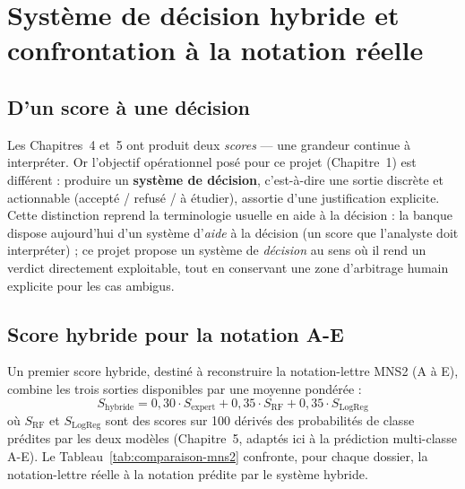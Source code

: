 \chapter{Système de décision hybride et confrontation à la notation réelle}

\section{D'un score à une décision}

Les Chapitres~4 et~5 ont produit deux \emph{scores} — une grandeur continue à interpréter. Or
l'objectif opérationnel posé pour ce projet (Chapitre~1) est différent : produire un
\textbf{système de décision}, c'est-à-dire une sortie discrète et actionnable
(accepté / refusé / à étudier), assortie d'une justification explicite. Cette distinction reprend
la terminologie usuelle en aide à la décision : la banque dispose aujourd'hui d'un système
d'\emph{aide} à la décision (un score que l'analyste doit interpréter) ; ce projet propose un
système de \emph{décision} au sens où il rend un verdict directement exploitable, tout en
conservant une zone d'arbitrage humain explicite pour les cas ambigus.

\section{Score hybride pour la notation A-E}

Un premier score hybride, destiné à reconstruire la notation-lettre MNS2 (A à E), combine les
trois sorties disponibles par une moyenne pondérée :
\[
S_{\text{hybride}} = 0{,}30 \cdot S_{\text{expert}} + 0{,}35 \cdot S_{\text{RF}} + 0{,}35 \cdot S_{\text{LogReg}}
\]
où $S_{\text{RF}}$ et $S_{\text{LogReg}}$ sont des scores sur 100 dérivés des probabilités de
classe prédites par les deux modèles (Chapitre~5, adaptés ici à la prédiction multi-classe A-E).
Le Tableau~\ref{tab:comparaison-mns2} confronte, pour chaque dossier, la notation-lettre réelle à
la notation prédite par le système hybride.

